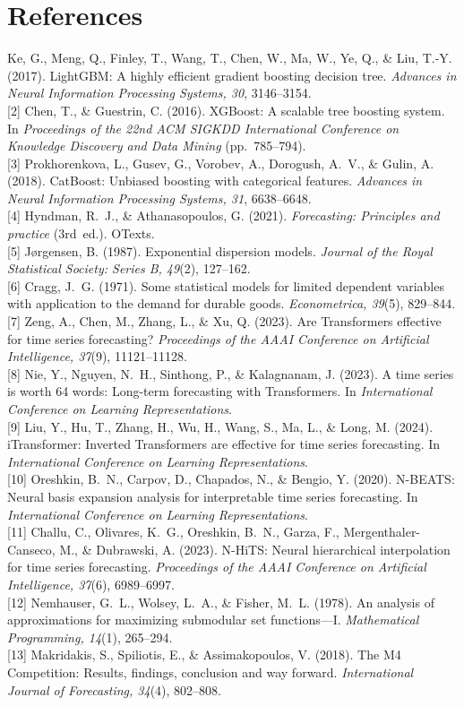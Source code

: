 \documentclass[11pt]{article}
\begin{document}
\section*{References}
\footnotesize
\setlength{\parskip}{2pt}
\noindent
[1] Ke, G., Meng, Q., Finley, T., Wang, T., Chen, W., Ma, W., Ye, Q., \& Liu, T.-Y. (2017). LightGBM: A highly efficient gradient boosting decision tree. \emph{Advances in Neural Information Processing Systems, 30}, 3146--3154. \\{}
[2] Chen, T., \& Guestrin, C. (2016). XGBoost: A scalable tree boosting system. In \emph{Proceedings of the 22nd ACM SIGKDD International Conference on Knowledge Discovery and Data Mining} (pp.~785--794). \\{}
[3] Prokhorenkova, L., Gusev, G., Vorobev, A., Dorogush, A.~V., \& Gulin, A. (2018). CatBoost: Unbiased boosting with categorical features. \emph{Advances in Neural Information Processing Systems, 31}, 6638--6648. \\{}
[4] Hyndman, R.~J., \& Athanasopoulos, G. (2021). \emph{Forecasting: Principles and practice} (3rd~ed.). OTexts. \\{}
[5] J\o{}rgensen, B. (1987). Exponential dispersion models. \emph{Journal of the Royal Statistical Society: Series B, 49}(2), 127--162. \\{}
[6] Cragg, J.~G. (1971). Some statistical models for limited dependent variables with application to the demand for durable goods. \emph{Econometrica, 39}(5), 829--844. \\{}
[7] Zeng, A., Chen, M., Zhang, L., \& Xu, Q. (2023). Are Transformers effective for time series forecasting? \emph{Proceedings of the AAAI Conference on Artificial Intelligence, 37}(9), 11121--11128. \\{}
[8] Nie, Y., Nguyen, N.~H., Sinthong, P., \& Kalagnanam, J. (2023). A time series is worth 64 words: Long-term forecasting with Transformers. In \emph{International Conference on Learning Representations}. \\{}
[9] Liu, Y., Hu, T., Zhang, H., Wu, H., Wang, S., Ma, L., \& Long, M. (2024). iTransformer: Inverted Transformers are effective for time series forecasting. In \emph{International Conference on Learning Representations}. \\{}
[10] Oreshkin, B.~N., Carpov, D., Chapados, N., \& Bengio, Y. (2020). N-BEATS: Neural basis expansion analysis for interpretable time series forecasting. In \emph{International Conference on Learning Representations}. \\{}
[11] Challu, C., Olivares, K.~G., Oreshkin, B.~N., Garza, F., Mergenthaler-Canseco, M., \& Dubrawski, A. (2023). N-HiTS: Neural hierarchical interpolation for time series forecasting. \emph{Proceedings of the AAAI Conference on Artificial Intelligence, 37}(6), 6989--6997. \\{}
[12] Nemhauser, G.~L., Wolsey, L.~A., \& Fisher, M.~L. (1978). An analysis of approximations for maximizing submodular set functions---I. \emph{Mathematical Programming, 14}(1), 265--294. \\{}
[13] Makridakis, S., Spiliotis, E., \& Assimakopoulos, V. (2018). The M4 Competition: Results, findings, conclusion and way forward. \emph{International Journal of Forecasting, 34}(4), 802--808.
\end{document}
